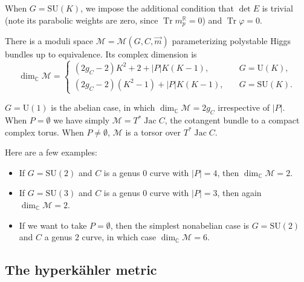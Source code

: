 \documentclass[12pt,letterpaper,reqno]{article}
\numberwithin{equation}{section}
\newcommand{\cM}{\ensuremath{\mathcal M}}
\newcommand{\R}{\ensuremath{\mathbb R}}
\newcommand{\C}{\ensuremath{\mathbb C}}
\newcommand{\hk}{hyperk\"ahler\xspace}
\newcommand{\abs}[1]{\lvert#1\rvert}
\DeclareMathOperator{\Tr}{Tr}
\DeclareMathOperator{\Jac}{Jac}
\newcommand{\SU}{\mathrm{SU}}
\newcommand{\U}{\mathrm{U}}
\begin{document}
\begin{defn}[Higgs bundles for $G = \SU(K)$]
When $G = \SU(K)$, we impose the additional condition that
$\det E$ is trivial (note its parabolic weights are zero, since
$\Tr m_p^\R = 0$) and $\Tr \varphi = 0$.
\end{defn}


\begin{prop}
There is a moduli space $\cM = \cM(G,C,\vec{m})$ parameterizing
polystable Higgs bundles up to equivalence.
Its complex dimension is
\begin{equation} \label{eq:dim-M}
  \dim_\C \cM = \begin{cases} (2g_C-2) K^2 + 2 + \abs{P} K(K-1), & \quad G = \U(K), \\ (2g_C-2) (K^2-1) + \abs{P} K(K-1), & \quad G = \SU(K). \end{cases}
\end{equation}
\end{prop}

\begin{example}
$G = \U(1)$ is the abelian case, in which $\dim_\C \cM = 2g_C$ irrespective
of $\abs{P}$. When $P = \emptyset$ we have simply $\cM = T^* \Jac C$, the cotangent
bundle to a compact complex torus. When $P \neq \emptyset$, $\cM$ is a torsor
over $T^* \Jac C$.
\end{example}

\begin{example} Here are a few examples:
\begin{itemize}
\item If $G = \SU(2)$ and $C$ is a genus $0$ curve with $\abs{P} = 4$,
then $\dim_\C \cM = 2$.
\item If $G = \SU(3)$
and $C$ is a genus $0$ curve with $\abs{P}=3$,
then again $\dim_\C \cM = 2$.
\item If we want to take $P = \emptyset$,
then the simplest nonabelian case is
$G = \SU(2)$ and $C$ a genus $2$ curve, in which case
$\dim_\C \cM = 6$. 
\end{itemize}
\end{example}


\subsection{The \hk metric}
\end{document}
